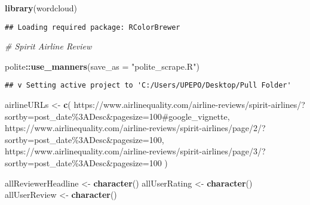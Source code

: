 \documentclass[
]{article}
\newenvironment{Shaded}{\begin{snugshade}}{\end{snugshade}}
\newcommand{\AttributeTok}[1]{\textcolor[rgb]{0.13,0.29,0.53}{#1}}
\newcommand{\CommentTok}[1]{\textcolor[rgb]{0.56,0.35,0.01}{\textit{#1}}}
\newcommand{\FunctionTok}[1]{\textcolor[rgb]{0.13,0.29,0.53}{\textbf{#1}}}
\newcommand{\NormalTok}[1]{#1}
\newcommand{\OtherTok}[1]{\textcolor[rgb]{0.56,0.35,0.01}{#1}}
\newcommand{\SpecialCharTok}[1]{\textcolor[rgb]{0.81,0.36,0.00}{\textbf{#1}}}
\newcommand{\StringTok}[1]{\textcolor[rgb]{0.31,0.60,0.02}{#1}}
\begin{document}
\begin{Shaded}
\begin{Highlighting}[]
\FunctionTok{library}\NormalTok{(wordcloud)}
\end{Highlighting}
\end{Shaded}

\begin{verbatim}
## Loading required package: RColorBrewer
\end{verbatim}

\begin{Shaded}
\begin{Highlighting}[]
\CommentTok{\# Spirit Airline Review}

\NormalTok{polite}\SpecialCharTok{::}\FunctionTok{use\_manners}\NormalTok{(}\AttributeTok{save\_as =} \StringTok{"polite\_scrape.R"}\NormalTok{)}
\end{Highlighting}
\end{Shaded}

\begin{verbatim}
## v Setting active project to 'C:/Users/UPEPO/Desktop/Pull Folder'
\end{verbatim}

\begin{Shaded}
\begin{Highlighting}[]
\NormalTok{airlineURLs }\OtherTok{\textless{}{-}} \FunctionTok{c}\NormalTok{(}
  \StringTok{\textquotesingle{}https://www.airlinequality.com/airline{-}reviews/spirit{-}airlines/?sortby=post\_date\%3ADesc\&pagesize=100\#google\_vignette\textquotesingle{}}\NormalTok{,}
  \StringTok{\textquotesingle{}https://www.airlinequality.com/airline{-}reviews/spirit{-}airlines/page/2/?sortby=post\_date\%3ADesc\&pagesize=100\textquotesingle{}}\NormalTok{,}
  \StringTok{\textquotesingle{}https://www.airlinequality.com/airline{-}reviews/spirit{-}airlines/page/3/?sortby=post\_date\%3ADesc\&pagesize=100\textquotesingle{}}
\NormalTok{)}

\NormalTok{allReviewerHeadline }\OtherTok{\textless{}{-}} \FunctionTok{character}\NormalTok{()}
\NormalTok{allUserRating }\OtherTok{\textless{}{-}} \FunctionTok{character}\NormalTok{()}
\NormalTok{allUserReview }\OtherTok{\textless{}{-}} \FunctionTok{character}\NormalTok{()}
\end{Highlighting}
\end{Shaded}
\end{document}
